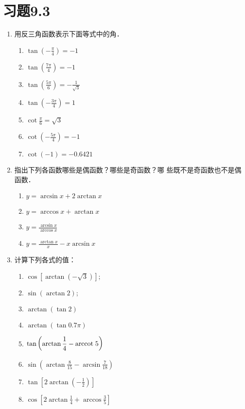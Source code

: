 \section*{习题9.3}
\begin{enumerate}
    \item 用反三角函数表示下面等式中的角．
\begin{multicols}{2}
\begin{enumerate}
    \item $\tan\left(-\frac{\pi}{4}\right)=-1$
    \item $\tan\left(\frac{7\pi}{4}\right)=-1$
    \item $\tan\left(\frac{5\pi}{6}\right)=-\frac{1}{\sqrt{3}}$
    \item $\tan\left(-\frac{3\pi}{4}\right)=1$
    \item $\cot\frac{\pi}{6}=\sqrt{3}$
    \item $\cot\left(-\frac{5\pi}{4}\right)=-1$
    \item $\cot\left(-1\right)=-0.6421$
\end{enumerate}
\end{multicols}

\item 指出下列各函数哪些是偶函数？哪些是奇函数？哪
些既不是奇函数也不是偶函数．
\begin{multicols}{2}
    \begin{enumerate}
    \item $y=\arcsin x+2 \arctan x$
    \item $y=\arccos x+\arctan x$
    \item $y=\frac{\arcsin x}{\arccos x}$
    \item $y=\frac{\arctan x}{x}-x \arcsin x$
    \end{enumerate}
    \end{multicols}

    \item 计算下列各式的值：
\begin{multicols}{2}
\begin{enumerate}
\item  $\cos [\arctan(-\sqrt{3})]$;
\item  $\sin (\arctan 2)$;
\item $\arctan(\tan2)$
\item  $\arctan(\tan0.7 \pi)$
\item $\tan\left(\arctan \dfrac{1}{4}-{\rm arccot\; }  5\right)$
\item $\sin \left(\arctan \frac{8}{15}-\arcsin \frac{7}{18}\right)$
\item $\tan\left[2 \arctan\left(-\frac{1}{2}\right)\right]$
\item $\cos \left[2 \arctan \frac{1}{4}+\arccos \frac{3}{5}\right]$
\end{enumerate}
\end{multicols}


\end{enumerate}
